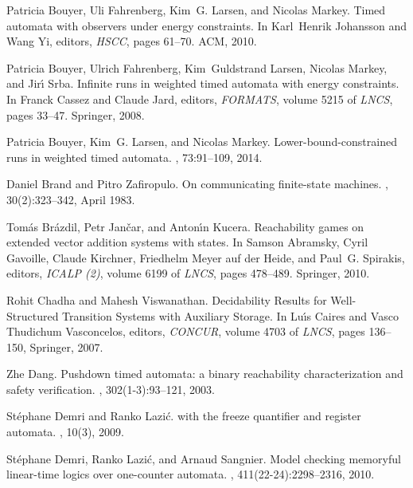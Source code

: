 \documentclass{CSML}
\theoremstyle{plain}\newtheorem{theorem}[thm]{Theorem}
\theoremstyle{plain}\newtheorem{corollary}[thm]{Corollary}
\theoremstyle{plain}\newtheorem{example}[thm]{Example}
\theoremstyle{plain}\newtheorem{lemma}[thm]{Lemma}
\theoremstyle{plain}\newtheorem{remark}[thm]{Remark}
\begin{document}
\begin{thebibliography}{Kos97}
Patricia Bouyer, Uli Fahrenberg, Kim~G. Larsen, and Nicolas Markey.
\newblock Timed automata with observers under energy constraints.
\newblock In Karl~Henrik Johansson and Wang Yi, editors, {\em HSCC}, pages
  61--70. ACM, 2010.

Patricia Bouyer, Ulrich Fahrenberg, Kim~Guldstrand Larsen, Nicolas Markey, and
  Jir\'{\i} Srba.
\newblock Infinite runs in weighted timed automata with energy constraints.
\newblock In Franck Cassez and Claude Jard, editors, {\em FORMATS}, volume 5215
  of {\em LNCS}, pages 33--47. Springer, 2008.

Patricia Bouyer, Kim~G. Larsen, and Nicolas Markey.
\newblock Lower-bound-constrained runs in weighted timed automata.
, 73:91--109, 2014.

Daniel Brand and Pitro Zafiropulo.
\newblock On communicating finite-state machines.
, 30(2):323--342, April 1983.

Tom{\'a}s Br{\'a}zdil, Petr Jan\v{c}ar, and Anton\'{\i}n Kucera.
\newblock Reachability games on extended vector addition systems with states.
\newblock In Samson Abramsky, Cyril Gavoille, Claude Kirchner, Friedhelm {Meyer
  auf der Heide}, and Paul~G. Spirakis, editors, {\em ICALP (2)}, volume 6199
  of {\em LNCS}, pages 478--489. Springer, 2010.
  
  
  
  Rohit Chadha and Mahesh Viswanathan.
  \newblock Decidability Results for Well-Structured Transition Systems with Auxiliary Storage.
  \newblock In Lu{\'{\i}}s Caires and Vasco Thudichum Vasconcelos, editors, {\em CONCUR}, volume 4703 of {\em LNCS}, pages 136--150, Springer, 2007.

Zhe Dang.
\newblock Pushdown timed automata: a binary reachability characterization and
  safety verification.
, 302(1-3):93--121, 2003.

St{\'e}phane Demri and Ranko Lazi\'{c}.
 with the freeze quantifier and register automata.
, 10(3), 2009.



St{\'e}phane Demri, Ranko Lazi{\'c}, and Arnaud Sangnier.
\newblock Model checking memoryful linear-time logics over one-counter
  automata.
, 411(22-24):2298--2316, 2010.  
  

\end{thebibliography}
\end{document}
